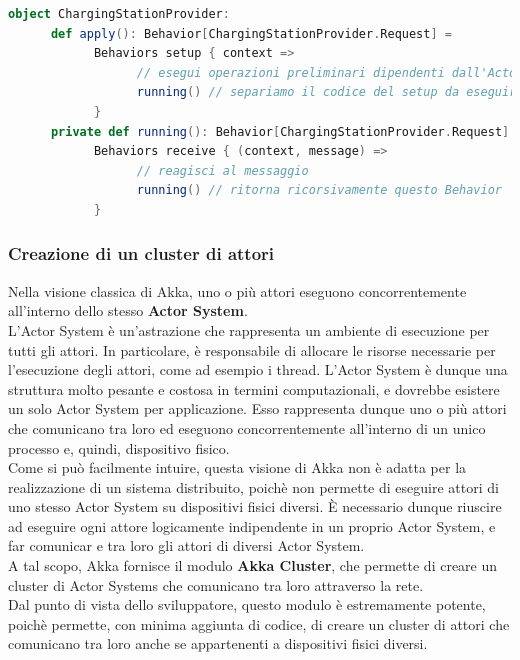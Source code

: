 \begin{lstlisting}[language=scala]
object ChargingStationProvider:
      def apply(): Behavior[ChargingStationProvider.Request] = 
            Behaviors setup { context =>
                  // esegui operazioni preliminari dipendenti dall'Actor Context
                  running() // separiamo il codice del setup da eseguire una sola volta con il codice effettivo del Behavior
            }
      private def running(): Behavior[ChargingStationProvider.Request] = 
            Behaviors receive { (context, message) =>
                  // reagisci al messaggio
                  running() // ritorna ricorsivamente questo Behavior
            }
\end{lstlisting}

\subsubsection{Creazione di un cluster di attori}
Nella visione classica di Akka, uno o più attori eseguono concorrentemente all'interno dello stesso
\textbf{Actor System}.\\

L'Actor System è un'astrazione che rappresenta un ambiente di esecuzione per tutti gli attori.
In particolare, è responsabile di allocare le risorse necessarie per l'esecuzione degli attori,
come ad esempio i thread.
L'Actor System è dunque una struttura molto pesante e costosa in termini computazionali, e dovrebbe
esistere un solo Actor System per applicazione.
Esso rappresenta dunque uno o più attori che comunicano tra loro ed eseguono concorrentemente all'interno
di un unico processo e, quindi, dispositivo fisico.\\

Come si può facilmente intuire, questa visione di Akka non è adatta per la realizzazione di un sistema
distribuito, poichè non permette di eseguire attori di uno stesso Actor System su dispositivi fisici
diversi. È necessario dunque riuscire ad eseguire ogni attore logicamente indipendente in un
proprio Actor System, e far comunicar e tra loro gli attori di diversi Actor System.\\

A tal scopo, Akka fornisce il modulo \textbf{Akka Cluster}\cite{akkacluster}, che permette
di creare un cluster di Actor Systems che comunicano tra loro attraverso la rete.\\

Dal punto di vista dello sviluppatore, questo modulo è estremamente potente, poichè permette,
con minima aggiunta di codice, di creare un cluster di attori che comunicano tra loro anche se
appartenenti a dispositivi fisici diversi.\\

